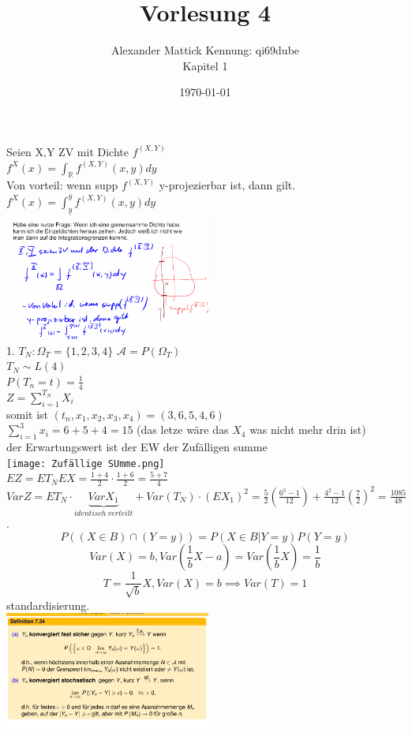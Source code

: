 \documentclass{article}
\author{
Alexander Mattick Kennung: qi69dube\\
Kapitel 1
}
\date{\today}
\title{Vorlesung 4}
\begin{document}
	\maketitle
	Seien X,Y ZV mit Dichte $f^{(X,Y)}$\\
	$f^{X}(x)=\int_\mathbb{R} f^{(X,Y)}(x,y)dy$\\
	Von vorteil: wenn supp $f^{(X,Y)}$ y-projezierbar ist, dann gilt.\\
	$f^{X}(x)=\int_{\underline{y}}^{\overline{y}} f^{(X,Y)} (x,y) dy$\\
	\includegraphics[width=256px]{teildichte.png}\\
	1. $T_N:\Omega_T=\{1,2,3,4\}$ $\mathcal{A} = P(\Omega_T)$\\
	$T_N\sim L(4)$\\
	$P(T_n=t) =\frac{1}{4}$\\
	$Z=\sum ^{T_N} _{i=1} X_i$\\
	somit ist $(t_n,x_1,x_2,x_3,x_4) = (3,6,5,4,6)$\\
	$\sum^3_{i=1} x_i = 6+5+4=15$ (das letze wäre das $X_4$ was nicht mehr drin ist)\\
	der Erwartungswert ist der EW der Zufälligen summe\\
	\texttt{[image: Zufällige SUmme.png]}\\
	$EZ = ET_N EX = \frac{1+4}{2}\cdot \frac{1+6}{2} = \frac{5+7}{4}$\\
	$Var Z = ET_N\cdot \underbrace{Var X_1}_{identisch\ verteilt}+Var(T_N)\cdot (EX_1)^2=\frac{5}{2}(\frac{6^2-1}{12})+\frac{4^2-1}{12}(\frac{7}{2})^2 = \frac{1085}{48}$.\\
	\[P((X\in B)\cap (Y=y)) = P(X\in B|Y=y)P(Y=y)\]
	\[Var(X)=b,Var(\frac{1}{b}X-a)=Var(\frac{1}{b}X)=\frac{1}{b}\]
	\[T=\frac{1}{\sqrt{b}}X, Var(X)=b\implies Var(T)=1\]
	standardisierung.\\
	\includegraphics[width=256px]{FastSicher.png}
\end{document}
